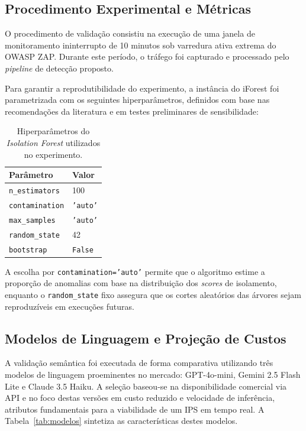 \documentclass[sigconf, anonymous]{acmart}
\begin{document}
\subsection{Procedimento Experimental e Métricas}
\label{sec:metodologia_procedimento}

O procedimento de validação consistiu na execução de uma janela de monitoramento ininterrupto de 10 minutos sob varredura ativa extrema do OWASP ZAP. Durante este período, o tráfego foi capturado e processado pelo \textit{pipeline} de detecção proposto. 

Para garantir a reprodutibilidade do experimento, a instância do \ac{iForest} foi parametrizada com os seguintes hiperparâmetros, definidos com base nas recomendações da literatura e em testes preliminares de sensibilidade:

\begin{table}[htbp]
\centering
\caption{Hiperparâmetros do \textit{Isolation Forest} utilizados no experimento.}
\label{tab:iforest_params}
\begin{tabular}{ll}
\toprule
\textbf{Parâmetro} & \textbf{Valor} \\
\midrule
\texttt{n\_estimators} & 100 \\
\texttt{contamination} & \texttt{'auto'} \\
\texttt{max\_samples} & \texttt{'auto'} \\
\texttt{random\_state} & 42 \\
\texttt{bootstrap} & \texttt{False} \\
\bottomrule
\end{tabular}
\end{table}

A escolha por \texttt{contamination='auto'} permite que o algoritmo estime a proporção de anomalias com base na distribuição dos \textit{scores} de isolamento, enquanto o \texttt{random\_state} fixo assegura que os cortes aleatórios das árvores sejam reproduzíveis em execuções futuras.

\subsection{Modelos de Linguagem e Projeção de Custos}
\label{sec:cost_proj}

A validação semântica foi executada de forma comparativa utilizando três modelos de linguagem proeminentes no mercado: GPT-4o-mini, Gemini 2.5 Flash Lite e Claude 3.5 Haiku. A seleção baseou-se na disponibilidade comercial via \ac{API} e no foco destas versões em custo reduzido e velocidade de inferência, atributos fundamentais para a viabilidade de um \ac{IPS} em tempo real. A Tabela~\ref{tab:modelos} sintetiza as características destes modelos.
\end{document}

